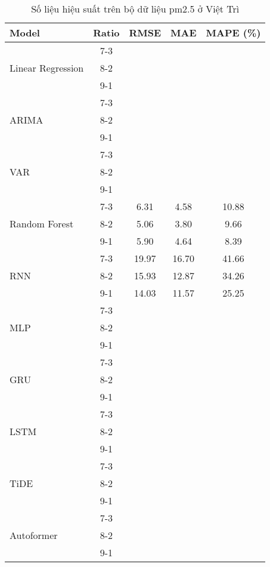 \begin{table}[h!]
    \centering
    \caption{Số liệu hiệu suất trên bộ dữ liệu pm2.5 ở Việt Trì}
    \begin{tabular}{|l|c|c|c|c|}
    \hline
    \rowcolor{orange!30} \textbf{Model} & \textbf{Ratio} & \textbf{RMSE} & \textbf{MAE} & \textbf{MAPE (\%)} \\ \hline
    \rowcolor{white} & 7-3 &  &  &  \\ 
    \rowcolor{white} Linear Regression & 8-2 &  &  &  \\ 
    \rowcolor{white} & 9-1 &  &  &  \\ \hline
    \rowcolor{white} & 7-3 &  &  &  \\ 
    \rowcolor{white} ARIMA & 8-2 &  &  &  \\ 
    \rowcolor{white} & 9-1 &  &  &  \\ \hline
    \rowcolor{white} & 7-3 &  &  &  \\ 
    \rowcolor{white} VAR & 8-2 &  &  &  \\ 
    \rowcolor{white} & 9-1 &  &  & \\ \hline
    \rowcolor{white} & 7-3 & 6.31 & 4.58 & 10.88 \\ 
    \rowcolor{white} Random Forest & 8-2 & 5.06 & 3.80 & 9.66 \\ 
    \rowcolor{white} & 9-1 & 5.90 & 4.64 & 8.39 \\ \hline
    \rowcolor{white}  & 7-3 & 19.97 & 16.70 & 41.66 \\ 
    \rowcolor{white} RNN & 8-2 & 15.93 & 12.87 & 34.26 \\ 
    \rowcolor{white}  & 9-1 & 14.03 & 11.57 & 25.25 \\ \hline
    \rowcolor{white} & 7-3 &  &  &  \\ 
    \rowcolor{white} MLP & 8-2 &  &  &  \\ 
    \rowcolor{white} & 9-1 &  &  &  \\ \hline
    \rowcolor{white} & 7-3 &  &  &  \\ 
    \rowcolor{white} GRU & 8-2 &  &  &  \\ 
    \rowcolor{white} & 9-1 &  &  &  \\ \hline
    \rowcolor{white} & 7-3 &  &  &  \\ 
    \rowcolor{white} LSTM & 8-2 &  &  &  \\ 
    \rowcolor{white} & 9-1 &  &  &  \\ \hline
    \rowcolor{white!30} & 7-3 &  &  &  \\ 
    \rowcolor{white!30} TiDE & 8-2 &  &  &  \\ 
    \rowcolor{white!30} & 9-1 &  &  &  \\ \hline
    \rowcolor{white} & 7-3 &  &  &  \\ 
    \rowcolor{white} Autoformer & 8-2 &  &  &  \\ 
    \rowcolor{white} & 9-1 &  &  &  \\ \hline

    \end{tabular}
\end{table}